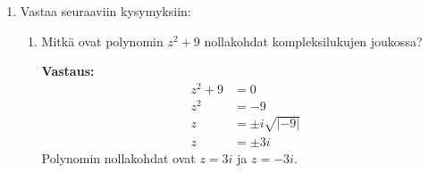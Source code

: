 \documentclass[a4paper,12pt]{article}
\begin{document}
\begin{enumerate}
2: Käytetään eksponenttien laskusääntöjä:
\begin{equation*}
    e^{i(\theta+\varphi)} + e^{i(\theta-\varphi)} = e^{i\theta}e^{i\varphi} + e^{i\theta}e^{-i\varphi} = e^{i\theta}\left(e^{i\varphi} + e^{-i\varphi}\right).
\end{equation*}
Sovelletaan sulkulausekkeeseen Eulerin kaavaa: 
\begin{align*}
    e^{i\varphi} + e^{-i\varphi} &= (\cos\varphi + i\sin\varphi) + (\cos(-\varphi) + i\sin(-\varphi)) \\
    &= \cos\varphi + i\sin\varphi + \cos\varphi - i\sin\varphi \\
    &= 2\cos\varphi.
\end{align*}
Sijoitetaan tämä takaisin lausekkeeseen $e^{i\theta}\left(e^{i\varphi} + e^{-i\varphi}\right)$:
\begin{align*}
    e^{i\theta}\left(e^{i\varphi} + e^{-i\varphi}\right) &= (\cos\theta + i\sin\theta)(2\cos\varphi) \\
    &= 2\cos\theta\cos\varphi + i(2\sin\theta\cos\varphi).
\end{align*}

Koska tavat 1 ja 2 kuvaavat samaa summalauseketta, niiden on oltava yhtä suuret keskenään:
\begin{equation*}
    \big(\cos(\theta+\varphi) + \cos(\theta-\varphi)\big) + i\big(\sin(\theta+\varphi) + \sin(\theta-\varphi)\big) = 2\cos\theta\cos\varphi + i(2\sin\theta\cos\varphi).
\end{equation*}

Kun vertaamme yhtälöiden imaginääriosia, saadaan:
\begin{equation*}
    \sin(\theta+\varphi) + \sin(\theta-\varphi) = 2\sin\theta\cos\varphi.
\end{equation*}
Kaava on näin todistettu oikeaksi.

\item Vastaa seuraaviin kysymyksiin: \begin{enumerate}
    \item Mitk\"a ovat polynomin $z^2+9$ nollakohdat kompleksilukujen joukossa?
    
    \textbf{Vastaus:} 
    \begin{align*}
        z^2+9&=0\\
        z^2&=-9\\
        z&=\pm i\sqrt{|-9|}\\
        z&=\pm3i
    \end{align*}
    Polynomin nollakohdat ovat $z=3i$ ja $z=-3i$. 
    

\end{enumerate}
\end{enumerate}
\end{document}
